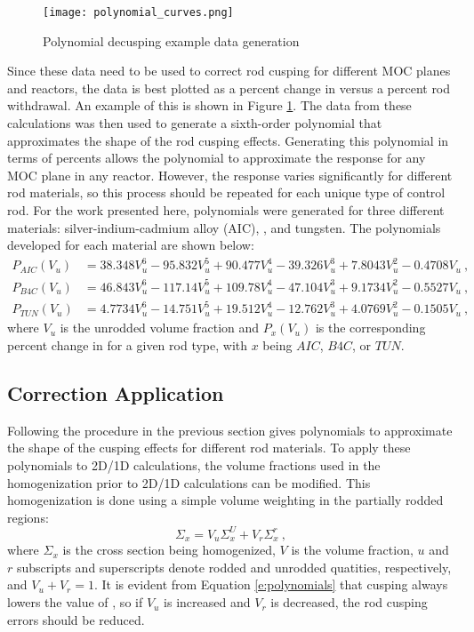 \begin{figure}[h]
    \centering
    \texttt{[image: polynomial\_curves.png]}
    \caption{Polynomial decusping example data generation}\label{f:polynomial}
\end{figure}

Since these data need to be used to correct rod cusping for different MOC planes and reactors, the data is best plotted as a percent change in \keff{} versus a percent rod withdrawal.  An example of this is shown in Figure \ref{f:polynomial}.  The data from these calculations was then used to generate a sixth-order polynomial that approximates the shape of the rod cusping effects.  Generating this polynomial in terms of percents allows the polynomial to approximate the response for any MOC plane in any reactor.  However, the response varies significantly for different rod materials, so this process should be repeated for each unique type of control rod.  For the work presented here, polynomials were generated for three different materials: silver-indium-cadmium alloy (AIC), \bfc{}, and tungsten.  The polynomials developed for each material are shown below:
\begin{align}\label{e:polynomials}
P_{AIC}\left(V_u\right) &= 38.348 V_u^6 - 95.832 V_u^5 + 90.477 V_u^4 - 39.326 V_u^3 + 7.8043 V_u^2 - 0.4708 V_u \ ,\\
P_{B4C}\left(V_u\right) &= 46.843 V_u^6 - 117.14 V_u^5  + 109.78 V_u^4 - 47.104 V_u^3 + 9.1734 V_u^2 - 0.5527 V_u \ ,\\
P_{TUN}\left(V_u\right) &= 4.7734 V_u^6 - 14.751 V_u^5 + 19.512 V_u^4 - 12.762 V_u^3 + 4.0769 V_u^2 - 0.1505 V_u \ ,
\end{align}
where $V_u$ is the unrodded volume fraction and $P_x\left(V_u\right)$ is the corresponding percent change in \keff{} for a given rod type, with $x$ being $AIC$, $B4C$, or $TUN$.

\subsection{Correction Application}

Following the procedure in the previous section gives polynomials to approximate the shape of the cusping effects for different rod materials.  To apply these polynomials to 2D/1D calculations, the volume fractions used in the homogenization prior to 2D/1D calculations can be modified.  This homogenization is done using a simple volume weighting in the partially rodded regions:
\begin{equation}
\Sigma_x = V_u \Sigma_x^U + V_r \Sigma_x^r\ ,
\end{equation}
where $\Sigma_x$ is the cross section being homogenized, $V$ is the volume fraction, $u$ and $r$ subscripts and superscripts denote rodded and unrodded quatities, respectively, and $V_u + V_r = 1$.  It is evident from Equation \ref{e:polynomials} that cusping always lowers the value of \keff{}, so if $V_u$ is increased and $V_r$ is decreased, the rod cusping errors should be reduced.

